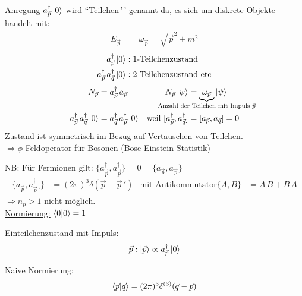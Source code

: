 Anregung $a_{\vec{p}}^\dagger \ket{0}$ wird ``Teilchen\,'\,' genannt da, es sich um diskrete Objekte handelt mit: 
	\begin{align*}
		E_{\vec{p}} &= \omega_{\vec{p}} = \sqrt{\vec{p}^2 + m^2} 
	\end{align*}
	\begin{align*}
		a_{\vec{p}}^\dagger \ket{0} &: \text{1-Teilchenzustand} \\
		a_{\vec{p}}^\dagger\, a_{\vec{q}}^\dagger \ket{0} &: \text{2-Teilchenzustand etc}
	\end{align*}
	\begin{align*}
		N_{\vec{p}} &= a_{\vec{p}}^\dagger \,a_{\vec{p}} & 
		N_{\vec{p}} \ket{\psi} &= \underbrace{\omega_{\vec{p}}}_{\mathclap{\text{Anzahl der Teilchen mit Impuls }\vec{p}}} \ket{\psi} \\
		a_{\vec{p}}^\dagger\, a_{\vec{q}}^\dagger \ket{0} &= a_{\vec{q}}^\dagger\, a_{\vec{p}}^\dagger \ket{0} &
		\text{weil } [a_{\vec{p}}^\dagger, a_{\vec{q}}^\dagger] &= [a_{\vec{p}}, a_{\vec{q}}] = 0
	\end{align*}
Zustand ist symmetrisch im Bezug auf Vertauschen von Teilchen. 
\\
$\Rightarrow \phi$ Feldoperator für Bosonen (Bose-Einstein-Statistik) 

NB: Für Fermionen gilt: $ \{a_{\vec{p}}^\dagger, a_{\vec{p}}^\dagger\} = 0 = \{a_{\vec{p}}, a_{\vec{p}}\}$ 
	\begin{align*}
		\{a_{\vec{p}}, a_{\vec{p}\,'}^\dagger\} &= (2 \pi)^3 \delta (\vec{p} - \vec{p}\,') 
		& \text{mit Antikommutator} \{A, B\} &= A\, B + B\, A
	\end{align*}
$\Rightarrow n_p > 1$ nicht möglich.
\\
\underline{Normierung:} $\braket{0 | 0} = 1$ 

Einteilchenzustand mit Impuls: %
	\begin{align*}
		\vec{p} : \ket{\vec{p}} \propto a_{\vec{p}}^\dagger \ket{0}
	\end{align*}

Naive Normierung: %
	\begin{align*}
		\braket{\vec{p} | \vec{q}} = (2 \pi)^3 \delta^{(3)}(\vec{q} - \vec{p})
	\end{align*}

